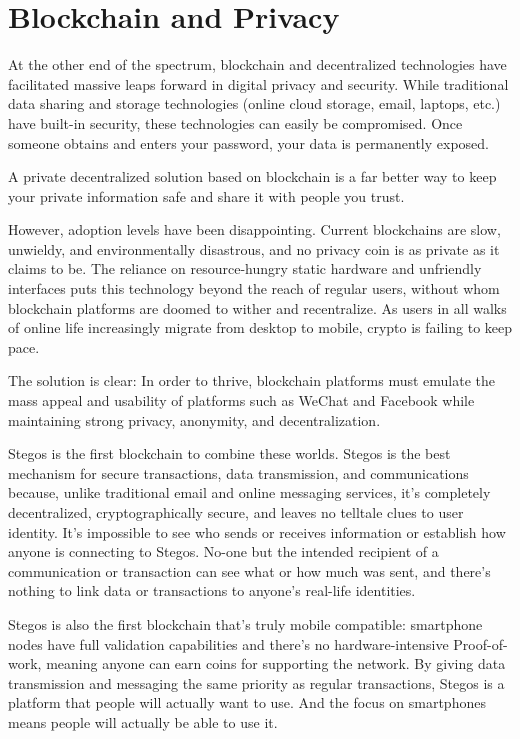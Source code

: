 \documentclass[8pt,fleqn,openany]{book}
\begin{document}
\section{Blockchain and Privacy}
At the other end of the spectrum, blockchain and decentralized technologies have facilitated massive leaps forward in digital privacy and security. While traditional data sharing and storage technologies (online cloud storage, email, laptops, etc.) have built-in security, these technologies can easily be compromised. Once someone obtains and enters your password, your data is permanently exposed.

A private decentralized solution based on blockchain is a far better way to keep your private information safe and share it with people you trust.

However, adoption levels have been disappointing. Current blockchains are slow, unwieldy, and environmentally disastrous, and no privacy coin is as private as it claims to be. The reliance on resource-hungry static hardware and unfriendly interfaces puts this technology beyond the reach of regular users, without whom blockchain platforms are doomed to wither and recentralize. As users in all walks of online life increasingly migrate from desktop to mobile, crypto is failing to keep pace. 

The solution is clear: In order to thrive, blockchain platforms must emulate the mass appeal and usability of platforms such as WeChat and Facebook while maintaining strong privacy, anonymity, and decentralization.

Stegos is the first blockchain to combine these worlds. Stegos is the best mechanism for secure transactions, data transmission, and communications because, unlike traditional email and online messaging services, it’s completely decentralized, cryptographically secure, and leaves no telltale clues to user identity. It’s impossible to see who sends or receives information or establish how anyone is connecting to Stegos. No-one but the intended recipient of a communication or transaction can see what or how much was sent, and there’s nothing to link data or transactions to anyone’s real-life identities.

Stegos is also the first blockchain that's truly mobile compatible: smartphone nodes have full validation capabilities and there's no hardware-intensive Proof-of-work, meaning anyone can earn coins for supporting the network. By giving data transmission and messaging the same priority as regular transactions, Stegos is a platform that people will actually want to use. And the focus on smartphones means people will actually be able to use it.
\end{document}

